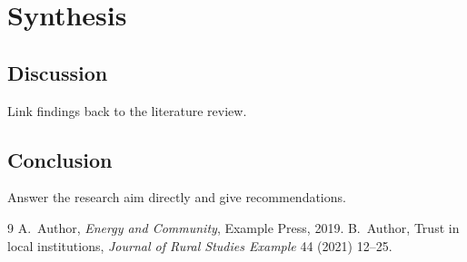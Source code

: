 \documentclass[11pt,a4paper,twoside,openright]{book}
\begin{document}
\part{Synthesis}

\chapter{Discussion}
Link findings back to the literature review.

\chapter{Conclusion}
Answer the research aim directly and give recommendations.

\backmatter

\begin{thebibliography}{9}
 A.~Author, \emph{Energy and Community}, Example Press, 2019.
 B.~Author, Trust in local institutions, \emph{Journal of Rural Studies Example} 44 (2021) 12--25.
\end{thebibliography}
\end{document}
